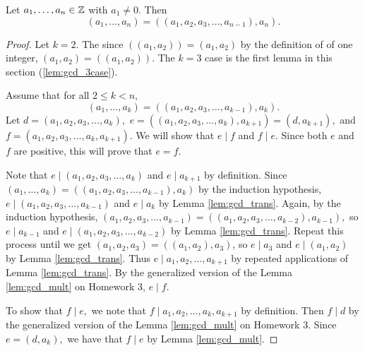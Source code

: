 \documentclass{ximera}
\begin{document}
\begin{proposition}
 	Let $a_1,\dots,a_n\in\mathbb Z$ with $a_1\neq 0$.  Then 
		\[
			(a_1,\dots,a_n)
			=((a_1,a_2,a_3,\dots,a_{n-1}),a_n).
		\]
	\begin{proof}
 		Let $k=2$. The since $((a_1,a_2))=(a_1,a_2)$ by the definition of  of one integer,  $(a_1,a_2)=((a_1,a_2))$. The $k=3$ case is the first lemma in this section (\ref{lem:gcd_3case}).
 
 		Assume that for all $2\leq k< n$, 
 			\[
				(a_1,\dots,a_k)
				=((a_1,a_2,a_3,\dots,a_{k-1}),a_k).
			\]
		Let $d=(a_1,a_2,a_3,\dots,a_{k}),$
		$e=((a_1,a_2,a_3,\dots,a_{k}),a_{k+1})=(d,a_{k+1}),$ and $f= (a_1,a_2,a_3,\dots,a_{k},a_{k+1}).$ We will show that $e\mid f$ and $f\mid e$. Since both $e$ and $f$ are positive, this will prove that $e=f$.

		Note that $e\mid (a_1,a_2,a_3,\dots,a_{k})$ and $e\mid a_{k+1}$ by definition. 
		Since $(a_1,\dots,a_k)=((a_1,a_2,a_3,\dots,a_{k-1}),a_k)$ by the induction hypothesis, $e\mid(a_1,a_2,a_3,\dots,a_{k-1})$ and $e\mid a_k$ by Lemma \ref{lem:gcd_trans}. Again, by the induction hypothesis, $(a_1,a_2,a_3,\dots,a_{k-1})=((a_1,a_2,a_3,\dots,a_{k-2}),a_{k-1}),$ so $e\mid a_{k-1}$ and $e\mid (a_1,a_2,a_3,\dots,a_{k-2})$ by Lemma \ref{lem:gcd_trans}. Repeat this process until we get $(a_1,a_2,a_3)=((a_1,a_2),a_3)$, so $e\mid a_3$ and $e\mid (a_1,a_2)$ by Lemma \ref{lem:gcd_trans}. Thus $e\mid a_1,a_2,\dots,a_{k+1}$ by repeated applications of Lemma \ref{lem:gcd_trans}. By the generalized version of the Lemma \ref{lem:gcd_mult} on Homework 3, $e\mid f.$

		To show that $f\mid e,$ we note that $f\mid a_1,a_2,\dots, a_k,a_{k+1}$ by definition. Then $f\mid d$ by the generalized version of the Lemma \ref{lem:gcd_mult} on Homework 3. Since $e=(d,a_k),$ we have that $f\mid e$ by Lemma \ref{lem:gcd_mult}.
	\end{proof}
\end{proposition}
\end{document}
